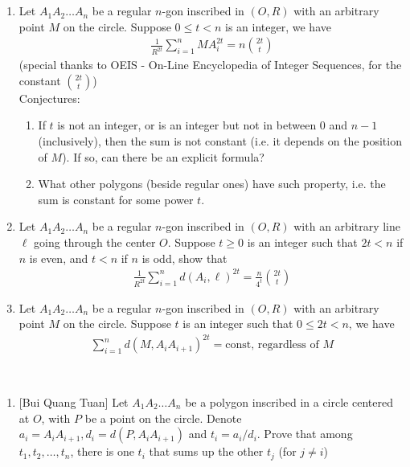 \documentclass{treatise}
\begin{document}
\begin{shaded}
\begin{theorem}[Kazarinoff]
\end{theorem}
\ \\
\begin{theorem} \ 
\begin{enumerate}
	\item Let $A_1 A_2 \hdots A_n$ be a regular $n$-gon inscribed in $(O, R)$ with an arbitrary point $M$ on the circle. Suppose $0 \leq t < n$ is an integer, we have
	\begin{align*}
	\frac{1}{R^{2t}} \sum_{i = 1}^n MA_i^{2t} = n {2t \choose t}
	\end{align*}
	(special thanks to OEIS - On-Line Encyclopedia of Integer Sequences, for the constant ${2t \choose t}$)
	\\
	Conjectures:
	\begin{enumerate}
		\item If $t$ is not an integer, or is an integer but not in between $0$ and $n - 1$ (inclusively), then the sum is not constant (i.e. it depends on the position of $M$). If so, can there be an explicit formula?
		\item What other polygons (beside regular ones) have such property, i.e. the sum is constant for some power $t$.
	\end{enumerate}
	\item Let $A_1 A_2 \hdots A_n$ be a regular $n$-gon inscribed in $(O, R)$ with an arbitrary line $\ell$ going through the center $O$. Suppose $t \geq 0$ is an integer such that $2t < n$ if $n$ is even, and $t < n$ if $n$ is odd, show that
	\begin{align*}
	\frac{1}{R^{2t}} \sum_{i = 1}^n d(A_i, \ell)^{2t} = \frac{n}{4^t} {2t \choose t}
	\end{align*}
	\item Let $A_1 A_2 \hdots A_n$ be a regular $n$-gon inscribed in $(O, R)$ with an arbitrary point $M$ on the circle. Suppose $t$ is an integer such that $0 \leq 2t < n$, we have
	\begin{align*}
	\sum_{i = 1}^n d(M, A_i A_{i + 1})^{2t} = \mbox{const, regardless of } M
	\end{align*}	
\end{enumerate}
\end{theorem}
\ \\
\begin{theorem}
\begin{enumerate}
	\item {[Bui Quang Tuan]} Let $A_1 A_2 \hdots A_n$ be a polygon inscribed in a circle centered at $O$, with $P$ be a point on the circle. Denote $a_i = A_i A_{i + 1}, d_i = d(P, A_i A_{i + 1})$ and $t_i = a_i/d_i$. Prove that among $t_1, t_2, \hdots, t_n$, there is one $t_i$ that sums up the other $t_j$ (for $j \neq i$)

\end{enumerate}
\end{theorem}
\end{shaded}
\end{document}
